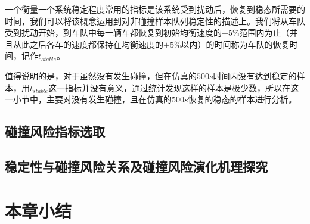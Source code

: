  一个衡量一个系统稳定程度常用的指标是该系统受到扰动后，恢复到稳态所需要的时间，我们可以将该概念运用到对非碰撞样本队列稳定性的描述上。我们将从车队受到扰动开始，到车队中每一辆车都恢复到初始均衡速度的$\pm 5\%$范围内为止（并且从此之后各车的速度都保持在均衡速度的$\pm 5\%以内$）的时间称为车队的恢复时间，记作$t_{stable}$。

 值得说明的是，对于虽然没有发生碰撞，但在仿真的$500s$时间内没有达到稳定的样本，用$t_{stable}$这一指标并没有意义，通过统计发现这样的样本是极少数，所以在这一小节中，主要对没有发生碰撞，且在仿真的$500s$恢复的稳态的样本进行分析。

\subsection{碰撞风险指标选取}

\subsection{稳定性与碰撞风险关系及碰撞风险演化机理探究}

\section{本章小结}